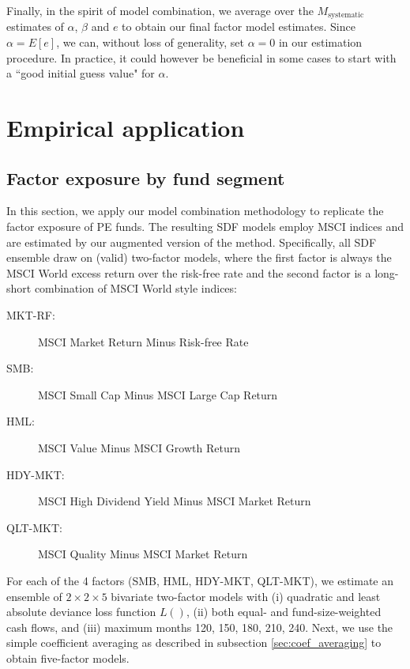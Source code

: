 \documentclass[12pt]{article}
\begin{document}
Finally, in the spirit of model combination, we average over the $M_{\mathrm{systematic}}$ estimates of $\alpha$, $\beta$ and $e$ to obtain our final factor model estimates.
Since $\alpha=E[e]$, we can, without loss of generality, set $\alpha=0$ in our estimation procedure.
In practice, it could however be beneficial in some cases to start with a ``good initial guess value" for $\alpha$.

\section{Empirical application}
\label{sec:applications}

\subsection{Factor exposure by fund segment}
\label{sec:factor_exposure}

In this section, we apply our model combination methodology to replicate the factor exposure of PE funds.
The resulting SDF models employ MSCI indices and are estimated by our augmented version of the \cite{DLP12} method.
Specifically, all SDF ensemble draw on (valid) two-factor models, where the first factor is always the MSCI World excess return over the risk-free rate and the second factor is a long-short combination of MSCI World style indices:
\begin{description}
	\item[MKT-RF:]{MSCI Market Return Minus Risk-free Rate}
	\item[SMB:]{MSCI Small Cap Minus MSCI Large Cap Return}
	\item[HML:]{MSCI Value Minus MSCI Growth Return}
	\item[HDY-MKT:]{MSCI High Dividend Yield Minus MSCI Market Return}
	\item[QLT-MKT:]{MSCI Quality Minus MSCI Market Return}
\end{description}
For each of the 4 factors (SMB, HML, HDY-MKT, QLT-MKT), we estimate an ensemble of $2 \times 2 \times 5$ bivariate two-factor models with (i) quadratic and least absolute deviance loss function $L()$, (ii) both equal- and fund-size-weighted cash flows, and (iii) maximum months 120, 150, 180, 210, 240.
Next, we use the simple coefficient averaging as described in subsection \ref{sec:coef_averaging} to obtain five-factor models.
\end{document}
